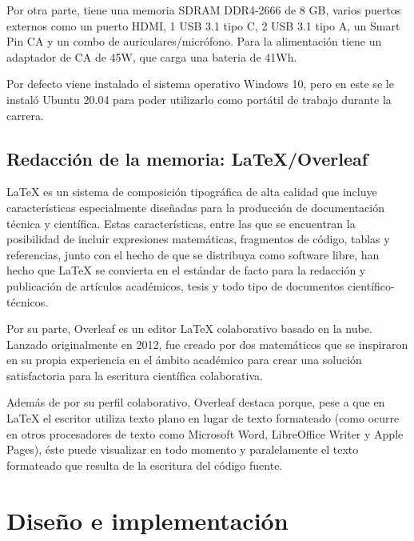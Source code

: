 \documentclass[a4paper, 12pt]{book}
\begin{document}
Por otra parte, tiene una memoria SDRAM DDR4-2666 de 8 GB, varios puertos externos como un puerto HDMI, 1 USB 3.1 tipo C, 2 USB 3.1 tipo A, un Smart Pin CA y un combo de auriculares/micrófono. Para la alimentación tiene un adaptador de CA de 45W, que carga una bateria de 41Wh.

Por defecto viene instalado el sistema operativo Windows 10, pero en este se le instaló Ubuntu 20.04 para poder utilizarlo como portátil de trabajo durante la carrera. 

\section{Redacción de la memoria: LaTeX/Overleaf}
\label{sec:redaccion_de_la_memoria}

LaTeX es un sistema de composición tipográfica de alta calidad que incluye características especialmente diseñadas para la producción de documentación técnica y científica. Estas características, entre las que se encuentran la posibilidad de incluir expresiones matemáticas, fragmentos de código, tablas y referencias, junto con el hecho de que se distribuya como software libre, han hecho que LaTeX se convierta en el estándar de facto para la redacción y publicación de artículos académicos, tesis y todo tipo de documentos científico-técnicos. 

Por su parte, Overleaf es un editor LaTeX colaborativo basado en la nube. Lanzado originalmente en 2012, fue creado por dos matemáticos que se inspiraron en su propia experiencia en el ámbito académico para crear una solución satisfactoria para la escritura científica colaborativa.

Además de por su perfil colaborativo, Overleaf destaca porque, pese a que en LaTeX el escritor utiliza texto plano en lugar de texto formateado (como ocurre en otros procesadores de texto como Microsoft Word, LibreOffice Writer y Apple Pages), éste puede visualizar en todo momento y paralelamente el texto formateado que resulta de la escritura del código fuente.

\cleardoublepage


\chapter{Diseño e implementación}
\label{chap:diseño}
\end{document}
